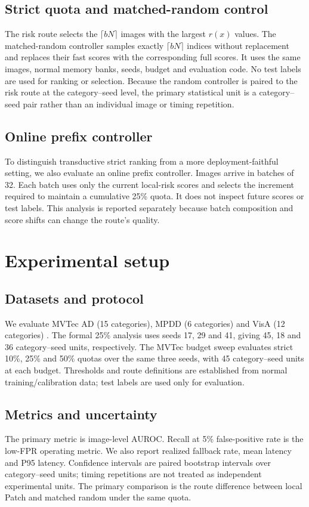 \documentclass[pdflatex,sn-vancouver-num]{sn-jnl}
\begin{document}
\subsection{Strict quota and matched-random control}
The risk route selects the $\lceil bN\rceil$ images with the largest $r(x)$ values. The matched-random controller samples exactly $\lceil bN\rceil$ indices without replacement and replaces their fast scores with the corresponding full scores. It uses the same images, normal memory banks, seeds, budget and evaluation code. No test labels are used for ranking or selection. Because the random controller is paired to the risk route at the category--seed level, the primary statistical unit is a category--seed pair rather than an individual image or timing repetition.

\subsection{Online prefix controller}
To distinguish transductive strict ranking from a more deployment-faithful setting, we also evaluate an online prefix controller. Images arrive in batches of 32. Each batch uses only the current local-risk scores and selects the increment required to maintain a cumulative 25\% quota. It does not inspect future scores or test labels. This analysis is reported separately because batch composition and score shifts can change the route's quality.

\section{Experimental setup}\label{sec:setup}

\subsection{Datasets and protocol}
We evaluate MVTec AD (15 categories), MPDD (6 categories) and VisA (12 categories) \cite{bergmann2019mvtec,zou2022visa}. The formal 25\% analysis uses seeds 17, 29 and 41, giving 45, 18 and 36 category--seed units, respectively. The MVTec budget sweep evaluates strict 10\%, 25\% and 50\% quotas over the same three seeds, with 45 category--seed units at each budget. Thresholds and route definitions are established from normal training/calibration data; test labels are used only for evaluation.

\subsection{Metrics and uncertainty}
The primary metric is image-level AUROC. Recall at 5\% false-positive rate is the low-FPR operating metric. We also report realized fallback rate, mean latency and P95 latency. Confidence intervals are paired bootstrap intervals over category--seed units; timing repetitions are not treated as independent experimental units. The primary comparison is the route difference between local Patch and matched random under the same quota.
\end{document}
